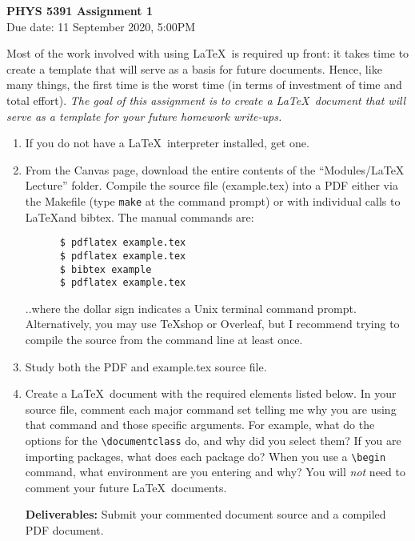 \documentclass[12pt, letterpaper]{article}
\begin{document}
\begin{center}
  {\LARGE \textbf{PHYS 5391 Assignment 1}}\\
  {\large Due date: 11 September 2020, 5:00PM}\\
\end{center}

Most of the work involved with using \LaTeX \ is required up front:
it takes time
to create a template that will serve as a basis for future documents.  Hence,
like many things, the first time is the worst time (in terms of investment of
time and total effort). 
\emph{The goal of this assignment is to create a \LaTeX \ 
document that will serve as a template for your future homework write-ups.}

\begin{enumerate}
  \item If you do not have a \LaTeX \ interpreter installed, get one.
  \item \label{part2} From the Canvas page, download the entire contents of the 
    ``Modules/LaTeX Lecture'' folder.  Compile the source file (example.tex)
    into a PDF either via the Makefile (type {\tt make} at the command prompt)
    or with individual calls to \LaTeX and bibtex.  The manual commands are:
    \begin{verbatim}
      $ pdflatex example.tex
      $ pdflatex example.tex
      $ bibtex example
      $ pdflatex example.tex\end{verbatim}
      ..where the dollar sign indicates a Unix terminal command prompt.
      Alternatively, you may use TeXshop or Overleaf, but I recommend trying
      to compile the source from the command line at least once.
  \item \label{part3} Study both the PDF and example.tex source file.
  \item Create a \LaTeX \ document with the required elements listed below.
    In your source file, comment each major command set telling me why you
    are using that command and those specific arguments.  For example,
    what do the options for the {\tt \textbackslash documentclass} do, and why
    did you select them?  If you are importing packages, what does each
    package do?  When you use a {\tt \textbackslash begin} command, what 
    environment are you entering and why?  You will \emph{not} need to 
    comment your future \LaTeX \ documents.

    \textbf{Deliverables:} Submit your commented document source and a 
    compiled PDF document.
\end{enumerate}
\end{document}
